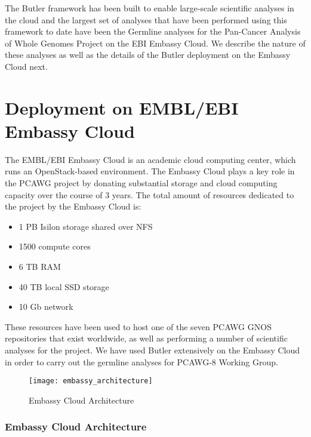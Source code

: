 The Butler framework has been built to enable large-scale scientific analyses in the cloud and the largest set of analyses that have been performed using this framework to date have been the Germline analyses for the Pan-Cancer Analysis of Whole Genomes Project on the EBI Embassy Cloud. We describe the nature of these analyses as well as the details of the Butler deployment on the Embassy Cloud next.

\section{Deployment on EMBL/EBI Embassy Cloud}

The EMBL/EBI Embassy Cloud\autocite{cook2016european} is an academic cloud computing center, which runs an OpenStack-based environment. The Embassy Cloud plays a key role in the PCAWG project by donating substantial storage and cloud computing capacity over the course of 3 years. The total amount of resources dedicated to the project by the Embassy Cloud is:

\begin{itemize}
\item 1 PB Isilon storage shared over NFS
\item 1500 compute cores
\item 6 TB RAM
\item 40 TB local SSD storage
\item 10 Gb network
\end{itemize}

These resources have been used to host one of the seven PCAWG GNOS repositories that exist worldwide, as well as performing a number of scientific analyses for the project. We have used Butler extensively on the Embassy Cloud in order to carry out the germline analyses for PCAWG-8 Working Group.

\begin{figure}[H]
\texttt{[image: embassy\_architecture]}
\centering
\caption {Embassy Cloud Architecture}
\label{fig:embassy_architecture}
\end{figure}

\subsubsection{Embassy Cloud Architecture}


